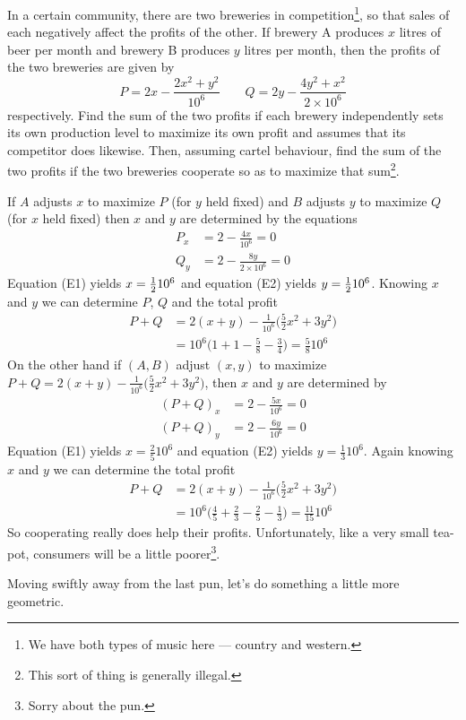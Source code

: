 \begin{eg}\label{eg:MXMNbrewery}
In a certain community, there are two breweries in competition\footnote{We have both types of music here --- country and western.}, so that
sales of each negatively affect the profits of the other. If brewery A
produces $x$ litres of beer per month and brewery B produces $y$ litres
per month, then the profits of the two breweries are given by
\begin{equation*}
P=2x-\frac{2x^2+y^2}{10^6}\qquad
Q=2y-\frac{4y^2+x^2}{2\times 10^6}
\end{equation*}
respectively. Find the sum of the two profits if each brewery independently
sets its own production level to maximize its own profit and assumes that
its competitor does likewise. Then, assuming cartel behaviour, 
find the sum of the two profits if the two
breweries cooperate so as to maximize that sum\footnote{This sort of thing is generally illegal.}.

\soln 
 If $A$ adjusts $x$ to maximize $P$ (for $y$ held fixed) and
$B$ adjusts $y$ to maximize $Q$ (for $x$ held fixed) then
$x$ and $y$ are determined by the equations
\begin{align*}
P_x&=2-\tfrac{4x}{10^6}=0 \tag{E1} \\
Q_y&=2-\tfrac{8y}{2\times 10^6}=0 \tag{E2}
\end{align*}
Equation (E1) yields  $x=\tfrac{1}{2} 10^6$ and 
equation (E2) yields  $y=\tfrac{1}{2} 10^6$.
Knowing $x$ and $y$ we can determine $P$, $Q$  and the total profit
\begin{align*}
P+Q&=2(x+y)-\tfrac{1}{10^6}\big(\tfrac{5}{2}x^2+3y^2\big)\\
   &=10^6\big(1+1-\tfrac{5}{8}-\tfrac{3}{4}\big)
                       =\tfrac{5}{8}10^6
\end{align*}
On the other hand if $(A,B)$ adjust $(x,y)$ to maximize $P+Q
=2(x+y)-\tfrac{1}{10^6}\big(\tfrac{5}{2}x^2+3y^2\big)$,  then
$x$ and $y$ are determined by
\begin{align*}
(P+Q)_x&=2-\tfrac{5x}{10^6}=0 \tag{E1} \\
(P+Q)_y&=2-\tfrac{6y}{10^6}=0 \tag{E2}
\end{align*}
Equation (E1) yields  $x=\tfrac{2}{5} 10^6$ and 
equation (E2) yields  $y=\tfrac{1}{3} 10^6$.
Again knowing $x$ and $y$ we can determine the total profit
\begin{align*}
P+Q&=2(x+y)-\tfrac{1}{10^6}\big(\tfrac{5}{2}x^2+3y^2\big)\\
   &=10^6\big(\tfrac{4}{5}+\tfrac{2}{3}-\tfrac{2}{5}-\tfrac{1}{3}\big)
                       =\tfrac{11}{15}10^6
\end{align*}
So cooperating really does help their profits. Unfortunately,
like a very small tea-pot, consumers will be a little poorer\footnote{Sorry about the pun.}.
\end{eg}
Moving swiftly away from the last pun, let's do something a little more geometric.


